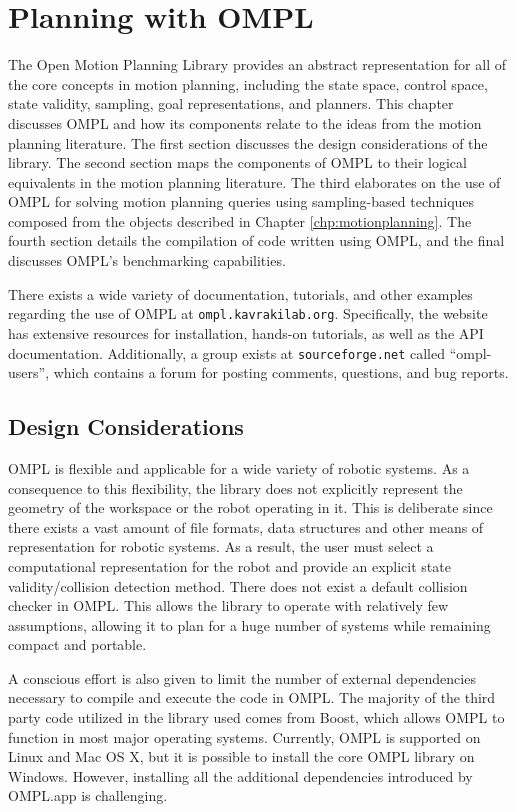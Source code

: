 \chapter {Planning with OMPL}
\label {chp:ompl}

The Open Motion Planning Library provides an abstract representation for all
of the core concepts in motion planning, including the state space, control space,
state validity, sampling, goal representations, and planners.  This chapter
discusses OMPL and how its components relate to the ideas from the motion
planning literature.  The first section discusses the design considerations of
the library.  The second section maps the components of OMPL to their logical
equivalents in the motion planning literature.  The third elaborates on the
use of OMPL for solving motion planning queries using sampling-based techniques
composed from the objects described in Chapter \ref{chp:motionplanning}.  The
fourth section details the compilation of code written using OMPL, and the final
discusses OMPL's benchmarking capabilities.

There exists a wide variety of documentation, tutorials, and other examples
regarding the use of OMPL at {\tt ompl.kavrakilab.org}.  Specifically, the
website has extensive resources for installation, hands-on tutorials, as well
as the API documentation.  Additionally, a group exists at {\tt sourceforge.net}
called ``ompl-users'', which contains a forum for posting comments, questions,
and bug reports.

\section {Design Considerations}
OMPL is flexible and applicable for a wide variety of robotic systems.  As a
consequence to this flexibility, the library does not explicitly represent the
geometry of the workspace or the robot operating in it.  This is deliberate
since there exists a vast amount of file formats, data structures and other
means of representation for robotic systems.  As a result, the user must select
a computational representation for the robot and provide an explicit state
validity/collision detection method.  There does not exist a default collision
checker in OMPL.  This allows the library to operate with relatively few
assumptions, allowing it to plan for a huge number of systems while remaining
compact and portable.

A conscious effort is also given to limit the number of external dependencies
necessary to compile and execute the code in OMPL.  The majority of the third
party code utilized in the library used comes from Boost, which allows OMPL to
function in most major operating systems.  Currently, OMPL is supported on Linux
and Mac OS X, but it is possible to install the core OMPL library on Windows.
However, installing all the additional dependencies introduced by OMPL.app is
challenging.

